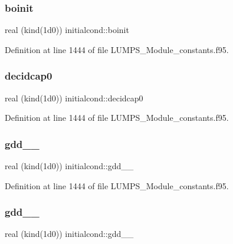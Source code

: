 \subsubsection{\texorpdfstring{boinit}{boinit}}
{\footnotesize\ttfamily real (kind(1d0)) initialcond\+::boinit}



Definition at line 1444 of file L\+U\+M\+P\+S\+\_\+\+Module\+\_\+constants.\+f95.

\mbox{\label{namespaceinitialcond_a09a143cb4c78f0b46e310f6eed172727}} 
\subsubsection{\texorpdfstring{decidcap0}{decidcap0}}
{\footnotesize\ttfamily real (kind(1d0)) initialcond\+::decidcap0}



Definition at line 1444 of file L\+U\+M\+P\+S\+\_\+\+Module\+\_\+constants.\+f95.

\mbox{\label{namespaceinitialcond_a2d30ed9339c2a7ee9a08bd15cb04e6a4}} 
\subsubsection{\texorpdfstring{gdd\+\_\+\_}{gdd\_1\_0}}
{\footnotesize\ttfamily real (kind(1d0)) initialcond\+::gdd\+\_\+\_}



Definition at line 1444 of file L\+U\+M\+P\+S\+\_\+\+Module\+\_\+constants.\+f95.

\mbox{\label{namespaceinitialcond_a7f2ecdcc8fa8441223d109c577f7ce40}} 
\subsubsection{\texorpdfstring{gdd\+\_\+\_}{gdd\_2\_0}}
{\footnotesize\ttfamily real (kind(1d0)) initialcond\+::gdd\+\_\+\_}



